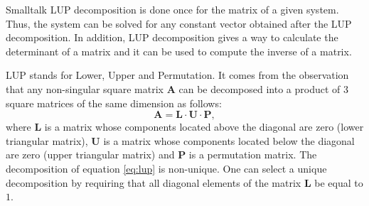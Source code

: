 \begin{displaycode}{Smalltalk}
LUP decomposition is done once for the matrix of a given system.
Thus, the system can be solved for any constant vector obtained
after the LUP decomposition. In addition, LUP decomposition gives
a way to calculate the determinant of a matrix and it can be used
to compute the inverse of a matrix.

LUP stands for Lower, Upper and Permutation. It comes from the
observation that any non-singular square matrix $\textbf{A}$ can be
decomposed into a product of 3 square matrices of the same
dimension as follows:
\begin{equation}
\label{eq:lup}
  \textbf{A}=\textbf{L}\cdot\textbf{U}\cdot\textbf{P},
\end{equation}
where ${\textbf{L}}$ is a matrix whose components located above the
diagonal are zero (lower triangular matrix), ${\textbf{U}}$ is a matrix
whose components located below the diagonal are zero (upper
triangular matrix) and ${\textbf{P}}$ is a permutation matrix. The
decomposition of equation \ref{eq:lup} is non-unique. One can
select a unique decomposition by requiring that all diagonal
elements of the matrix ${\textbf{L}}$ be equal to $1$.


\end{displaycode}
